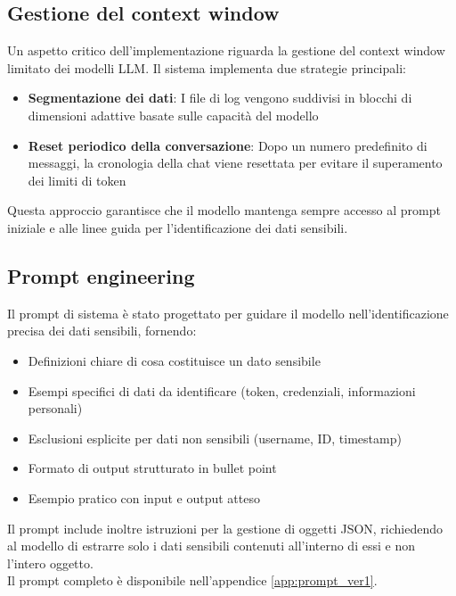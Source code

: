 \documentclass[12pt]{report}
\begin{document}
\subsection{Gestione del context window}
\label{subsec:ver1_context_window}

Un aspetto critico dell'implementazione riguarda la gestione del context window limitato dei modelli LLM. Il sistema implementa due strategie principali:

\begin{itemize}
    \item \textbf{Segmentazione dei dati}: I file di log vengono suddivisi in blocchi di dimensioni adattive basate sulle capacità del modello
    \item \textbf{Reset periodico della conversazione}: Dopo un numero predefinito di messaggi, la cronologia della chat viene resettata per evitare il superamento dei limiti di token
\end{itemize}

Questa approccio garantisce che il modello mantenga sempre accesso al prompt iniziale e alle linee guida per l'identificazione dei dati sensibili.

\subsection{Prompt engineering}
\label{subsec:ver1_prompt_engineering}

Il prompt di sistema è stato progettato per guidare il modello nell'identificazione precisa dei dati sensibili, fornendo:

\begin{itemize}
    \item Definizioni chiare di cosa costituisce un dato sensibile
    \item Esempi specifici di dati da identificare (token, credenziali, informazioni personali)
    \item Esclusioni esplicite per dati non sensibili (username, ID, timestamp)
    \item Formato di output strutturato in bullet point
    \item Esempio pratico con input e output atteso
\end{itemize}

Il prompt include inoltre istruzioni per la gestione di oggetti JSON, richiedendo al modello di estrarre solo i dati sensibili contenuti all'interno di essi e non l'intero oggetto. \\
Il prompt completo è disponibile nell'appendice \ref{app:prompt_ver1}.
\end{document}
